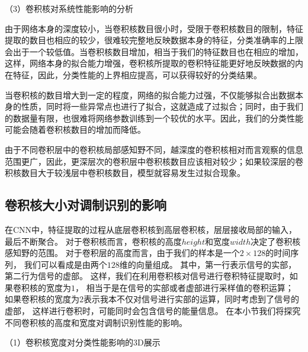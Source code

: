 \par
（3）卷积核对系统性能影响的分析\par
由于网络本身的深度较小，当卷积核数目很小时，受限于卷积核数目的限制，特征提取的数目也相应的较少，很难较完整地反映数据本身的特征，分类准确率的上限会出于一个较低值。当卷积核数目增加，相当于我们的特征数目也在相应的增加，这样，网络本身的拟合能力增强，卷积核所提取的卷积特征能更好地反映数据的内在特征，因此，分类性能的上界相应提高，可以获得较好的分类结果。\par
当卷积核的数目增大到一定的程度，网络的拟合能力过强，不仅能够拟合出数据本身的性质，同时将一些异常点也进行了拟合，这就造成了过拟合；同时，由于我们的数据量有限，也很难将网络参数训练到一个较优的水平。因此，我们的分类性能可能会随着卷积核数目的增加而降低。\par

由于不同卷积层中的卷积核局部感知野不同，越深度的卷积核相对而言观察的信息范围更广，因此，更深层次的卷积层中卷积核数目应该相对较少；如果较深层的卷积核数目大于较浅层中卷积核数目，模型就容易发生过拟合现象。

\subsection{卷积核大小对调制识别的影响}
在CNN中，特征提取的过程从底层卷积核到高层卷积核，层层接收局部的输入，最后不断聚合。
对于卷积核而言，卷积核的高度$height$和宽度$width$决定了卷积核感知野的范围。
对于卷积层的高度而言，由于我们的样本是一个$2\times128$的时间序列，
我们可以看成是由两个$128$维的向量组成。
其中，第一行表示信号的实部，第二行为信号的虚部。
这样，我们在利用卷积核对信号进行卷积特征提取时，如果卷积核的宽度为$1$，
相当于是在信号的实部或者虚部进行采样值的卷积运算；
如果卷积核的宽度为$2$表示我本不仅对信号进行实部的运算，同时考虑到了信号的虚部，
这样进行卷积时，可能同时会包含信号的能量信息。
在本小节我们将探究不同卷积核的高度和宽度对调制识别性能的影响。\par

（1）卷积核宽度对分类性能影响的3D展示\par


